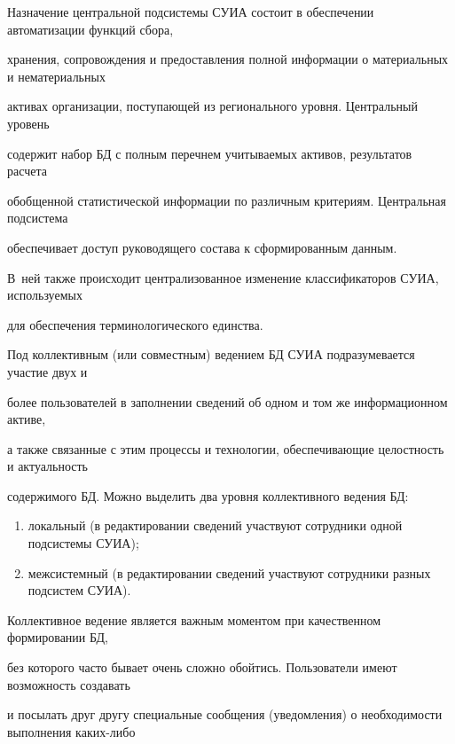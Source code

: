 Назначение центральной подсистемы СУИА состоит в обеспечении автоматизации функций сбора, 


 хранения, сопровождения и предоставления полной информации о материальных и нематериальных 


 активах организации, поступающей из регионального уровня. Центральный уровень 


 содержит набор БД с полным перечнем учитываемых активов, результатов расчета 


 обобщенной статистической информации по различным критериям. Центральная подсистема 


 обеспечивает доступ руководящего состава к сформированным данным. 


 В~ней также происходит централизованное изменение классификаторов СУИА, используемых


 для обеспечения терминологического единства.





Под коллективным (или совместным) ведением БД СУИА подразумевается участие двух и 


более пользователей в заполнении сведений об одном и том же информационном активе, 


а также связанные с этим процессы и технологии, обеспечивающие целостность и актуальность 


содержимого БД. Можно выделить два уровня коллективного ведения БД:


\begin{enumerate}[(1)]


\item  локальный (в редактировании сведений участвуют сотрудники одной под\-сис\-те\-мы СУИА);


\item


межсистемный (в редактировании сведений участвуют сотрудники разных подсистем СУИА).


\end{enumerate}





Коллективное ведение является важным моментом при качественном формировании БД, 


без которого часто бывает очень сложно обойтись. Пользователи имеют возможность создавать 


и посылать друг другу специальные сообщения (уведомления) о необходимости выполнения ка\-ких-ли\-бо 


